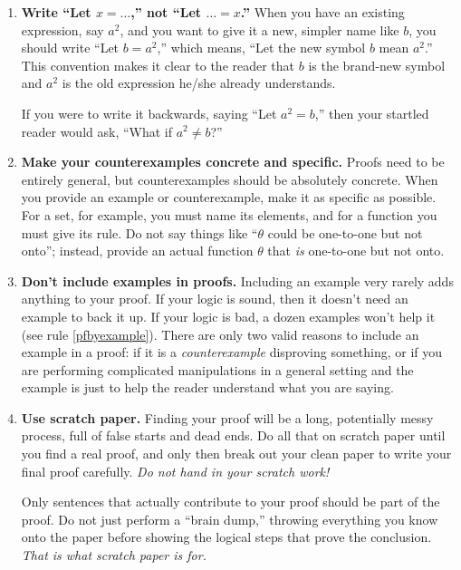 \begin{enumerate}
\item \textbf{Write ``Let $x=\dots$,'' not ``Let $\dots=x$.''} 
	When you have an existing expression, say $a^{2}$,
	and you want to give it a new, simpler name like $b$,
	you should write ``Let $b=a^{2}$,''
	which means, ``Let the new symbol $b$ mean $a^{2}$.''
	This convention makes it clear to the reader that $b$ is the brand-new symbol
	and $a^{2}$ is the old expression he/she already understands.
	
	If you were to write it backwards, saying ``Let $a^{2}=b$,''
	then your startled reader would ask,
	``What if $a^{2}\neq b$?''
  
\item \textbf{Make your counterexamples concrete and specific.}
	Proofs need to be entirely general,
	but counterexamples should be absolutely concrete.
	When you provide an example or counterexample,
	make it as specific as possible.
	For a set, for example, you must name its elements,
	and for a function you must give its rule.
	Do not say things like ``$\theta$ could be one-to-one but not onto'';
	instead, provide an actual function $\theta$ that \emph{is} one-to-one but not onto.
    
\item \textbf{Don't include examples in proofs.}
	Including an example very rarely adds anything to your proof.
	If your logic is sound, then it doesn't need an example to back it up.
	If your logic is bad, a dozen examples won't help it (see rule \ref{pfbyexample}).
	There are only two valid reasons to include an example in a proof:
	if it is a \emph{counterexample} disproving something,
	or if you are performing complicated manipulations in a general setting
	and the example is just to help the reader understand what you are saying.

 \item \textbf{Use scratch paper.}
	Finding your proof will be a long, potentially messy process, 
	full of false starts and dead ends.
	Do all that on scratch paper
	until you find a real proof,
	and only then break out your clean paper to write your final proof carefully.
	\emph{Do not hand in your scratch work!}
	
	Only sentences that actually contribute to your proof 
	should be part of the proof.
	Do not just perform a ``brain dump,''
	throwing everything you know onto the paper
	before showing the logical steps that prove the conclusion.
	\emph{That is what scratch paper is for.}

\end{enumerate}
